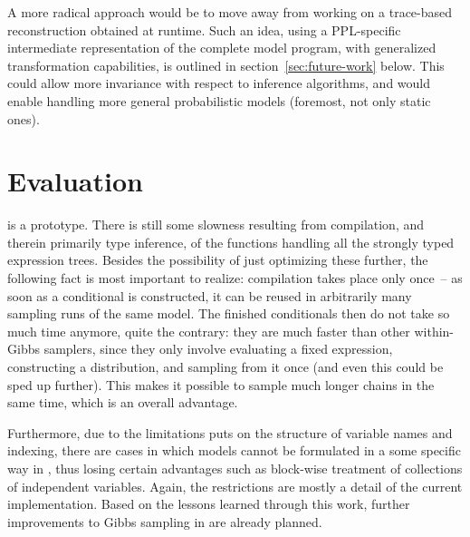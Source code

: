 A more radical approach would be to move away from working on a trace-based reconstruction obtained
at runtime.  Such an idea, using a PPL-specific intermediate representation of the complete model
program, with generalized transformation capabilities, is outlined in section~\ref{sec:future-work}
below.  This could allow more invariance with respect to inference algorithms, and would enable
handling more general probabilistic models (foremost, not only static ones).


\section{Evaluation}
\label{sec:autogibbs-eval}

\autogibbsjl{} is a prototype.  There is still some slowness resulting from compilation, and therein
primarily type inference, of the functions handling all the strongly typed expression trees.
Besides the possibility of just optimizing these further, the following fact is most important to
realize: compilation takes place only once~-- as soon as a conditional is constructed, it can be
reused in arbitrarily many sampling runs of the same model.  The finished conditionals then do not
take so much time anymore, quite the contrary: they are much faster than other within-Gibbs
samplers, since they only involve evaluating a fixed expression, constructing a distribution, and
sampling from it once (and even this could be sped up further).  This makes it possible to sample
much longer chains in the same time, which is an overall advantage.

Furthermore, due to the limitations \autogibbsjl{} puts on the structure of variable names and
indexing, there are cases in which models cannot be formulated in a some specific way in \dppljl{},
thus losing certain advantages such as block-wise treatment of collections of independent variables.
Again, the restrictions are mostly a detail of the current implementation.  Based on the lessons
learned through this work, further improvements to Gibbs sampling in \turingjl{} are already
planned.

